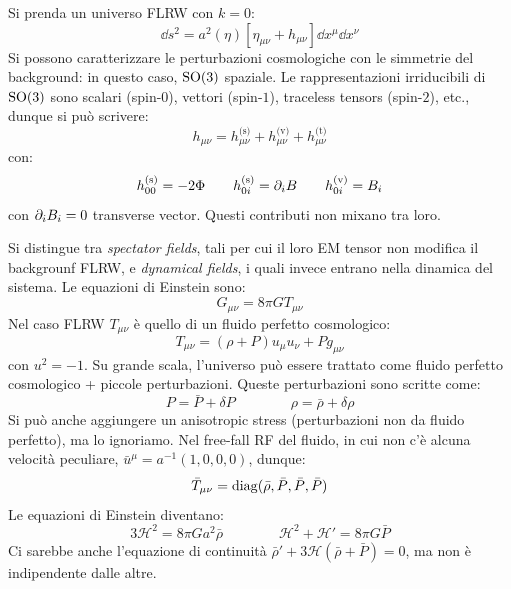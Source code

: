 Si prenda un universo FLRW con $ k = 0 $:
\begin{equation*}
  \dd s^2 = a^2(\eta) \left[ \eta_{\mu \nu} + h_{\mu \nu} \right] \dd x^\mu \dd x^\nu
\end{equation*}
Si possono caratterizzare le perturbazioni cosmologiche con le simmetrie del background: in questo caso, $ \mathrm{SO}(3) $ spaziale. Le rappresentazioni irriducibili di $ \mathrm{SO}(3) $ sono scalari (spin-$ 0 $), vettori (spin-$ 1 $), traceless tensors (spin-$ 2 $), etc., dunque si può scrivere:
\begin{equation}
  h_{\mu \nu} = h_{\mu \nu}^\text{(s)} + h_{\mu \nu}^\text{(v)} + h_{\mu \nu}^\text{(t)}
\end{equation}
con:
\begin{equation}
  h_{00}^\text{(s)} = - 2 \Phi
  \qquad
  h_{0i}^\text{(s)} = \partial_i B
  \qquad
  h_{0i}^\text{(v)} = B_i
\end{equation}
con $ \partial_i B_i = 0 $ transverse vector. Questi contributi non mixano tra loro.

Si distingue tra \emph{spectator fields}, tali per cui il loro EM tensor non modifica il backgrounf FLRW, e \emph{dynamical fields}, i quali invece entrano nella dinamica del sistema. Le equazioni di Einstein sono:
\begin{equation*}
  G_{\mu \nu} = 8 \pi G T_{\mu \nu}
\end{equation*}
Nel caso FLRW $ T_{\mu \nu} $ è quello di un fluido perfetto cosmologico:
\begin{equation}
  T_{\mu \nu} = (\rho + P) u_\mu u_\nu + P g_{\mu \nu}
\end{equation}
con $ u^2 = -1 $. Su grande scala, l'universo può essere trattato come fluido perfetto cosmologico + piccole perturbazioni. Queste perturbazioni sono scritte come:
\begin{equation*}
  P = \bar{P} + \delta P
  \qquad \qquad
  \rho = \bar{\rho} + \delta \rho
\end{equation*}
Si può anche aggiungere un anisotropic stress (perturbazioni non da fluido perfetto), ma lo ignoriamo. Nel free-fall RF del fluido, in cui non c'è alcuna velocità peculiare, $ \bar{u}^\mu = a^{-1} (1,0,0,0) $, dunque:
\begin{equation*}
  \bar{T}_{\mu \nu} = \operatorname{diag}(\bar{\rho} , \bar{P} , \bar{P} , \bar{P})
\end{equation*}
Le equazioni di Einstein diventano:
\begin{equation}
  3 \mathcal{H}^2 = 8 \pi G a^2 \bar{\rho}
  \qquad \qquad
  \mathcal{H}^2 + \mathcal{H}' = 8 \pi G \bar{P}
\end{equation}
Ci sarebbe anche l'equazione di continuità $ \bar{\rho}' + 3 \mathcal{H} (\bar{\rho} + \bar{P}) = 0 $, ma non è indipendente dalle altre.

